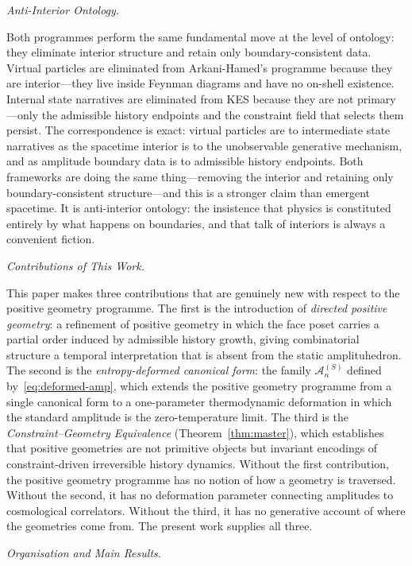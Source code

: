 \documentclass[12pt, oneside]{amsart}
\theoremstyle{plain}
\theoremstyle{definition}
\theoremstyle{remark}
\newcommand{\Sf}{S}
\begin{document}
\medskip\noindent\textit{Anti-Interior Ontology.}

Both programmes perform the same fundamental move at the level of ontology: they eliminate interior structure and retain only boundary-consistent data. Virtual particles are eliminated from Arkani-Hamed's programme because they are interior---they live inside Feynman diagrams and have no on-shell existence. Internal state narratives are eliminated from KES because they are not primary---only the admissible history endpoints and the constraint field that selects them persist. The correspondence is exact: virtual particles are to intermediate state narratives as the spacetime interior is to the unobservable generative mechanism, and as amplitude boundary data is to admissible history endpoints. Both frameworks are doing the same thing---removing the interior and retaining only boundary-consistent structure---and this is a stronger claim than emergent spacetime. It is anti-interior ontology: the insistence that physics is constituted entirely by what happens on boundaries, and that talk of interiors is always a convenient fiction.

\medskip\noindent\textit{Contributions of This Work.}

This paper makes three contributions that are genuinely new with respect to the positive geometry programme. The first is the introduction of \emph{directed positive geometry}: a refinement of positive geometry in which the face poset carries a partial order induced by admissible history growth, giving combinatorial structure a temporal interpretation that is absent from the static amplituhedron. The second is the \emph{entropy-deformed canonical form}: the family $\mathcal{A}_n^{(\Sf)}$ defined by~\eqref{eq:deformed-amp}, which extends the positive geometry programme from a single canonical form to a one-parameter thermodynamic deformation in which the standard amplitude is the zero-temperature limit. The third is the \emph{Constraint--Geometry Equivalence} (Theorem~\ref{thm:master}), which establishes that positive geometries are not primitive objects but invariant encodings of constraint-driven irreversible history dynamics. Without the first contribution, the positive geometry programme has no notion of how a geometry is traversed. Without the second, it has no deformation parameter connecting amplitudes to cosmological correlators. Without the third, it has no generative account of where the geometries come from. The present work supplies all three.

\medskip\noindent\textit{Organisation and Main Results.}
\end{document}
